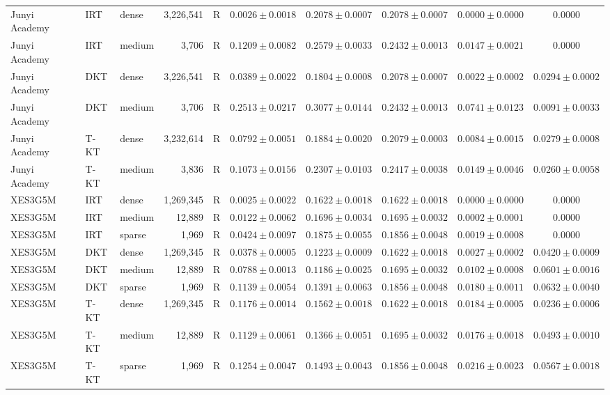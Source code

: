 \begin{table}[htbp]
{\begin{tabular}{lllrlccccc}
\midrule
Junyi Academy & IRT & dense & 3,226,541 & R & $0.0026\pm0.0018$ & $0.2078\pm0.0007$ & $0.2078\pm0.0007$ & $0.0000\pm0.0000$ & $0.0000$ \\
Junyi Academy & IRT & medium & 3,706 & R & $0.1209\pm0.0082$ & $0.2579\pm0.0033$ & $0.2432\pm0.0013$ & $0.0147\pm0.0021$ & $0.0000$ \\
Junyi Academy & DKT & dense & 3,226,541 & R & $0.0389\pm0.0022$ & $0.1804\pm0.0008$ & $0.2078\pm0.0007$ & $0.0022\pm0.0002$ & $0.0294\pm0.0002$ \\
Junyi Academy & DKT & medium & 3,706 & R & $0.2513\pm0.0217$ & $0.3077\pm0.0144$ & $0.2432\pm0.0013$ & $0.0741\pm0.0123$ & $0.0091\pm0.0033$ \\
Junyi Academy & T-KT & dense & 3,232,614 & R & $0.0792\pm0.0051$ & $0.1884\pm0.0020$ & $0.2079\pm0.0003$ & $0.0084\pm0.0015$ & $0.0279\pm0.0008$ \\
Junyi Academy & T-KT & medium & 3,836 & R & $0.1073\pm0.0156$ & $0.2307\pm0.0103$ & $0.2417\pm0.0038$ & $0.0149\pm0.0046$ & $0.0260\pm0.0058$ \\
\midrule
XES3G5M & IRT & dense & 1,269,345 & R & $0.0025\pm0.0022$ & $0.1622\pm0.0018$ & $0.1622\pm0.0018$ & $0.0000\pm0.0000$ & $0.0000$ \\
XES3G5M & IRT & medium & 12,889 & R & $0.0122\pm0.0062$ & $0.1696\pm0.0034$ & $0.1695\pm0.0032$ & $0.0002\pm0.0001$ & $0.0000$ \\
XES3G5M & IRT & sparse & 1,969 & R & $0.0424\pm0.0097$ & $0.1875\pm0.0055$ & $0.1856\pm0.0048$ & $0.0019\pm0.0008$ & $0.0000$ \\
XES3G5M & DKT & dense & 1,269,345 & R & $0.0378\pm0.0005$ & $0.1223\pm0.0009$ & $0.1622\pm0.0018$ & $0.0027\pm0.0002$ & $0.0420\pm0.0009$ \\
XES3G5M & DKT & medium & 12,889 & R & $0.0788\pm0.0013$ & $0.1186\pm0.0025$ & $0.1695\pm0.0032$ & $0.0102\pm0.0008$ & $0.0601\pm0.0016$ \\
XES3G5M & DKT & sparse & 1,969 & R & $0.1139\pm0.0054$ & $0.1391\pm0.0063$ & $0.1856\pm0.0048$ & $0.0180\pm0.0011$ & $0.0632\pm0.0040$ \\
XES3G5M & T-KT & dense & 1,269,345 & R & $0.1176\pm0.0014$ & $0.1562\pm0.0018$ & $0.1622\pm0.0018$ & $0.0184\pm0.0005$ & $0.0236\pm0.0006$ \\
XES3G5M & T-KT & medium & 12,889 & R & $0.1129\pm0.0061$ & $0.1366\pm0.0051$ & $0.1695\pm0.0032$ & $0.0176\pm0.0018$ & $0.0493\pm0.0010$ \\
XES3G5M & T-KT & sparse & 1,969 & R & $0.1254\pm0.0047$ & $0.1493\pm0.0043$ & $0.1856\pm0.0048$ & $0.0216\pm0.0023$ & $0.0567\pm0.0018$ \\
\bottomrule
\end{tabular}%
}
\end{table}
